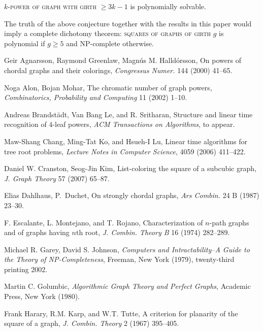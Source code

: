 \documentclass[proceedings]{stacs}
\begin{document}
\begin{conjecture}\label{conj}
\textsc{$k$-power of graph with girth $\ge 3k-1$} is polynomially solvable.
\end{conjecture}

The truth of the above conjecture together with the results in this paper would imply a
complete dichotomy theorem: \textsc{squares of graphs of girth $g$} is polynomial if
$g\ge 5$ and NP-complete otherwise.


\begin{thebibliography}{99}
  Geir Agnarsson, Raymond Greenlaw, Magn\'us M. Halld\'orsson,
  On powers of chordal graphs and their colorings,
  {\sl Congressus Numer.} 144 (2000) 41--65.

  Noga Alon, Bojan Mohar,
  The chromatic number of graph powers,
  {\sl Combinatorics, Probability and Computing} 11 (2002) 1--10.

  Andreas Brandst\"adt, Van Bang Le, and R. Sritharan,
  Structure and linear time recognition of $4$-leaf powers,
  {\sl ACM Transactions on Algorithms}, to appear.

  Maw-Shang Chang, Ming-Tat Ko, and Hsueh-I Lu,
  Linear time algorithms for tree root problems,
  {\sl Lecture Notes in Computer Science}, 4059 (2006) 411--422.

  Daniel W. Cranston, Seog-Jin Kim,
  List-coloring the square of a subcubic graph,
  {\sl J. Graph Theory} 57 (2007) 65--87.

  Elias Dahlhaus, P.~Duchet,
  On strongly chordal graphs,
  {\sl Ars Combin.} 24 B (1987) 23--30.

  F. Escalante, L. Montejano, and T. Rojano,
  Characterization of $n$-path graphs and of graphs having $n$th root,
  {\sl J. Combin. Theory B} 16 (1974) 282--289.

  Michael R. Garey, David S. Johnson,
  {\sl Computers and Intractability--A Guide to the Theory of NP-Completeness},
  Freeman, New York (1979), twenty-third printing 2002.

  Martin C. Golumbic,
  {\sl Algorithmic Graph Theory and Perfect Graphs},
  Academic Press, New York (1980).

  Frank Harary, R.M. Karp, and W.T. Tutte,
  A criterion for planarity of the square of a graph,
  {\sl J. Combin. Theory} 2 (1967) 395--405.


\end{thebibliography}
\end{document}
